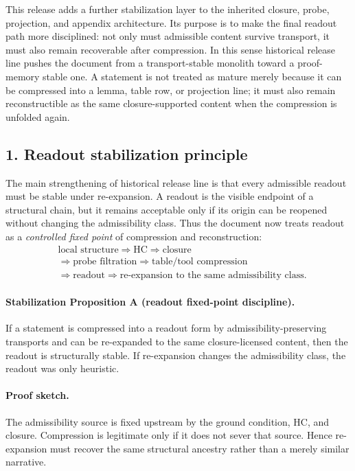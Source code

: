 \documentclass[12pt,a4paper]{article}
\DeclareRobustCommand{\QSCver}[1]{archival stage}
\renewcommand{\QSCver}[1]{historical release line}
\begin{document}
This release adds a further stabilization layer to the inherited closure, probe,
projection, and appendix architecture. Its purpose is to make the final readout
path more disciplined: not only must admissible content survive transport, it
must also remain recoverable after compression. In this sense \QSCver{v1.9.0} pushes
the document from a transport-stable monolith toward a proof-memory stable one.
A statement is not treated as mature merely because it can be compressed into a
lemma, table row, or projection line; it must also remain reconstructible as the
same closure-supported content when the compression is unfolded again.

\subsection*{1. Readout stabilization principle}
The main strengthening of \QSCver{v1.9.0} is that every admissible readout must be
stable under re-expansion. A readout is the visible endpoint of a structural
chain, but it remains acceptable only if its origin can be reopened without
changing the admissibility class. Thus the document now treats readout as a
\emph{controlled fixed point} of compression and reconstruction:
\[
\begin{aligned}
&\text{local structure} \Longrightarrow \text{HC} \Longrightarrow \text{closure}\\
&\Longrightarrow \text{probe filtration} \Longrightarrow \text{table/tool compression}\\
&\Longrightarrow \text{readout} \Longrightarrow \text{re-expansion to the same admissibility class}.
\end{aligned}
\]

\paragraph{Stabilization Proposition A (readout fixed-point discipline).}
If a statement is compressed into a readout form by admissibility-preserving
transports and can be re-expanded to the same closure-licensed content, then the
readout is structurally stable. If re-expansion changes the admissibility class,
the readout was only heuristic.

\paragraph{Proof sketch.}
The admissibility source is fixed upstream by the ground condition, HC, and
closure. Compression is legitimate only if it does not sever that source. Hence
re-expansion must recover the same structural ancestry rather than a merely
similar narrative.
\end{document}
